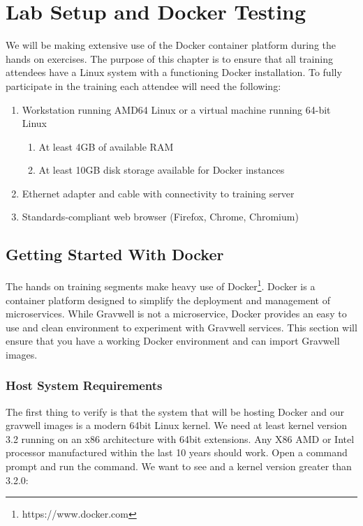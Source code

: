 \chapter{Lab Setup and Docker Testing}

We will be making extensive use of the Docker container platform during
the hands on exercises. The purpose of this chapter is to ensure that
all training attendees have a Linux system with a functioning Docker
installation. To fully participate in the training each attendee will
need the following:

\begin{enumerate}
	\item Workstation running AMD64 Linux or a virtual machine running 64-bit Linux
	\begin{enumerate}
		\item At least 4GB of available RAM
		\item At least 10GB disk storage available for Docker instances
	\end{enumerate}
	\item Ethernet adapter and cable with connectivity to training server
	\item Standards-compliant web browser (Firefox, Chrome, Chromium)
\end{enumerate}

\section{Getting Started With Docker}

The hands on training segments make heavy use of
Docker\footnote{https://www.docker.com}. Docker is
a container platform designed to simplify the deployment and management
of microservices. While Gravwell is not a microservice, Docker provides
an easy to use and clean environment to experiment with Gravwell
services. This section will ensure that you have a working Docker
environment and can import Gravwell images.

\subsection{Host System Requirements}

The first thing to verify is that the system that will be hosting
Docker and our gravwell images is a modern 64bit Linux kernel. We need
at least kernel version 3.2 running on an x86 architecture with 64bit
extensions. Any X86 AMD or Intel processor manufactured within the last
10 years should work. Open a command prompt and run the  command. We want to see  and a kernel version greater
than 3.2.0:

